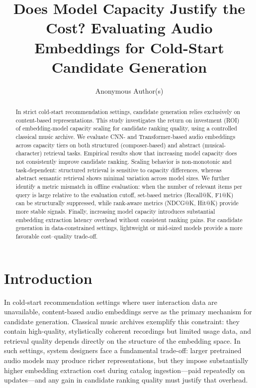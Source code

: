 \documentclass[sigconf]{acmart}
\begin{document}
\title{Does Model Capacity Justify the Cost? Evaluating Audio Embeddings for Cold-Start Candidate Generation}

\author{Anonymous Author(s)}

\renewcommand{\shortauthors}{Anonymous Author(s)}

\begin{abstract}
In strict cold-start recommendation settings, candidate generation relies exclusively on content-based representations. This study investigates the return on investment (ROI) of embedding-model capacity scaling for candidate ranking quality, using a controlled classical music archive. We evaluate CNN- and Transformer-based audio embeddings across capacity tiers on both structured (composer-based) and abstract (musical-character) retrieval tasks. Empirical results show that increasing model capacity does not consistently improve candidate ranking. Scaling behavior is non-monotonic and task-dependent: structured retrieval is sensitive to capacity differences, whereas abstract semantic retrieval shows minimal variation across model sizes. We further identify a metric mismatch in offline evaluation: when the number of relevant items per query is large relative to the evaluation cutoff, set-based metrics (Recall@K, F1@K) can be structurally suppressed, while rank-aware metrics (NDCG@K, Hit@K) provide more stable signals. Finally, increasing model capacity introduces substantial embedding extraction latency overhead without consistent ranking gains. For candidate generation in data-constrained settings, lightweight or mid-sized models provide a more favorable cost--quality trade-off.
\end{abstract}


\maketitle

\section{Introduction}\label{sec:introduction}
In cold-start recommendation settings where user interaction data are unavailable, content-based audio embeddings serve as the primary mechanism for candidate generation. Classical music archives exemplify this constraint: they contain high-quality, stylistically coherent recordings but limited usage data, and retrieval quality depends directly on the structure of the embedding space. In such settings, system designers face a fundamental trade-off: larger pretrained audio models may produce richer representations, but they impose substantially higher embedding extraction cost during catalog ingestion---paid repeatedly on updates---and any gain in candidate ranking quality must justify that overhead.
\end{document}
